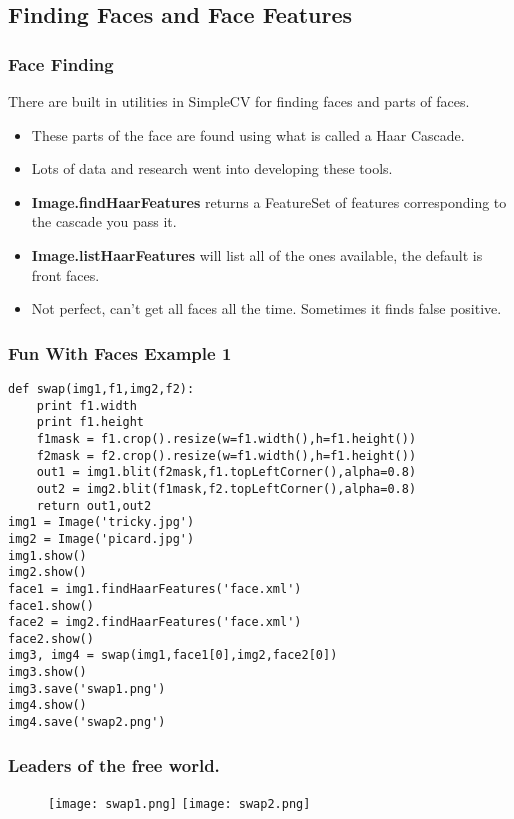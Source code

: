 \documentclass[compress]{beamer}
\begin{document}
\subsection{Finding Faces and Face Features}
\begin{frame}
  \frametitle{Face Finding}
There are built in utilities in SimpleCV for finding faces and parts
of faces.
\begin{itemize}
\item These parts of the face are found using what is called a Haar
  Cascade. 
\item Lots of data and research went into developing these tools. 
\item \textbf{Image.findHaarFeatures} returns a FeatureSet of features
  corresponding to the cascade you pass it.
\item \textbf{Image.listHaarFeatures} will list all of the ones
  available, the default is front faces. 
\item Not perfect, can't get all faces all the time. Sometimes it finds false positive.
\end{itemize}
\end{frame}
\begin{frame}[fragile] 
\frametitle{Fun With Faces Example 1}
\begin{example}
\begin{verbatim}
def swap(img1,f1,img2,f2):
    print f1.width
    print f1.height
    f1mask = f1.crop().resize(w=f1.width(),h=f1.height())
    f2mask = f2.crop().resize(w=f1.width(),h=f1.height())
    out1 = img1.blit(f2mask,f1.topLeftCorner(),alpha=0.8)
    out2 = img2.blit(f1mask,f2.topLeftCorner(),alpha=0.8)
    return out1,out2
img1 = Image('tricky.jpg')
img2 = Image('picard.jpg')
img1.show()
img2.show()
face1 = img1.findHaarFeatures('face.xml')
face1.show()
face2 = img2.findHaarFeatures('face.xml')
face2.show()
img3, img4 = swap(img1,face1[0],img2,face2[0])
img3.show()
img3.save('swap1.png')
img4.show()
img4.save('swap2.png')
\end{verbatim}
\end{example}
\end{frame} 
\begin{frame}
\frametitle{Leaders of the free world.}
 \begin{figure}
     \texttt{[image: swap1.png]}
     \quad
     \texttt{[image: swap2.png]}
 \end{figure}
\end{frame}
\end{document}
